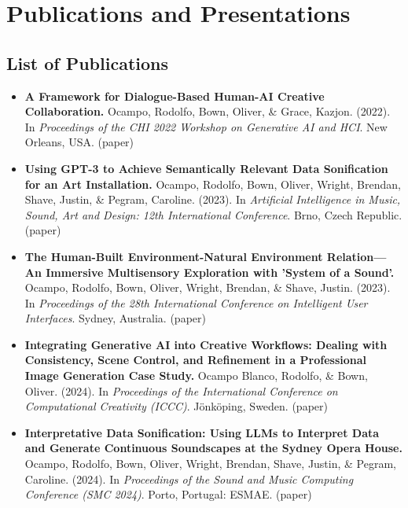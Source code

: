 \chapter{Publications and Presentations}

\section*{List of Publications}

\begin{itemize}
    \item \textbf{A Framework for Dialogue-Based Human-AI Creative Collaboration.} Ocampo, Rodolfo, Bown, Oliver, \& Grace, Kazjon. (2022). In \textit{Proceedings of the CHI 2022 Workshop on Generative AI and HCI}. New Orleans, USA. (paper)
    
    \item \textbf{Using GPT-3 to Achieve Semantically Relevant Data Sonification for an Art Installation.} Ocampo, Rodolfo, Bown, Oliver, Wright, Brendan, Shave, Justin, \& Pegram, Caroline. (2023). In \textit{Artificial Intelligence in Music, Sound, Art and Design: 12th International Conference}. Brno, Czech Republic. (paper)
    
    \item \textbf{The Human-Built Environment-Natural Environment Relation—An Immersive Multisensory Exploration with 'System of a Sound'.} Ocampo, Rodolfo, Bown, Oliver, Wright, Brendan, \& Shave, Justin. (2023). In \textit{Proceedings of the 28th International Conference on Intelligent User Interfaces}. Sydney, Australia. (paper)
    
    \item \textbf{Integrating Generative AI into Creative Workflows: Dealing with Consistency, Scene Control, and Refinement in a Professional Image Generation Case Study.} Ocampo Blanco, Rodolfo, \& Bown, Oliver. (2024). In \textit{Proceedings of the International Conference on Computational Creativity (ICCC)}. Jönköping, Sweden. (paper)
    
    \item \textbf{Interpretative Data Sonification: Using LLMs to Interpret Data and Generate Continuous Soundscapes at the Sydney Opera House.} Ocampo, Rodolfo, Bown, Oliver, Wright, Brendan, Shave, Justin, \& Pegram, Caroline. (2024). In \textit{Proceedings of the Sound and Music Computing Conference (SMC 2024)}. Porto, Portugal: ESMAE. (paper)
    
  
\end{itemize}

